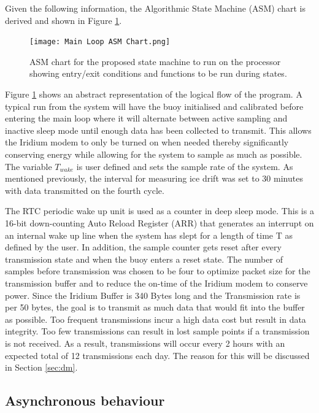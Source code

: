 Given the following information, the Algorithmic State Machine (ASM) chart is derived and shown in Figure \ref{fig:ASM_chart}.

\begin{figure}[H]
	\centering
	\texttt{[image: Main Loop ASM Chart.png]}
	\caption{ASM chart for the proposed state machine to run on the processor showing entry/exit conditions and functions to be run during states.}
	\label{fig:ASM_chart}
\end{figure}

Figure \ref{fig:ASM_chart} shows an abstract representation of the logical flow of the program. A typical run from the system will have the buoy initialised and calibrated before entering the main loop where it will alternate between active sampling and inactive sleep mode until enough data has been collected to transmit. This allows the Iridium modem to only be turned on when needed thereby significantly conserving energy while allowing for the system to sample as much as possible. The variable $T_{wake}$ is user defined and sets the sample rate of the system. As mentioned previously, the interval for measuring ice drift was set to 30 minutes with data transmitted on the fourth cycle.

The RTC periodic wake up unit is used as a counter in deep sleep mode. This is a 16-bit down-counting Auto Reload Register (ARR) that generates an interrupt on an internal wake up line when the system has slept for a length of time T as defined by the user. In addition, the sample counter gets reset after every transmission state and when the buoy enters a reset state. The number of samples before transmission was chosen to be four to optimize packet size for the transmission buffer and to reduce the on-time of the Iridium modem to conserve power. Since the Iridium Buffer is 340 Bytes long and the Transmission rate is per 50 bytes, the goal is to transmit as much data that would fit into the buffer as possible. Too frequent transmissions incur a high data cost but result in data integrity. Too few transmissions can result in lost sample points if a transmission is not received. As a result, transmissions will occur every 2 hours with an expected total of 12 transmissions each day. The reason for this will be discussed in Section \ref{sec:dm}.

\subsection{Asynchronous behaviour}

